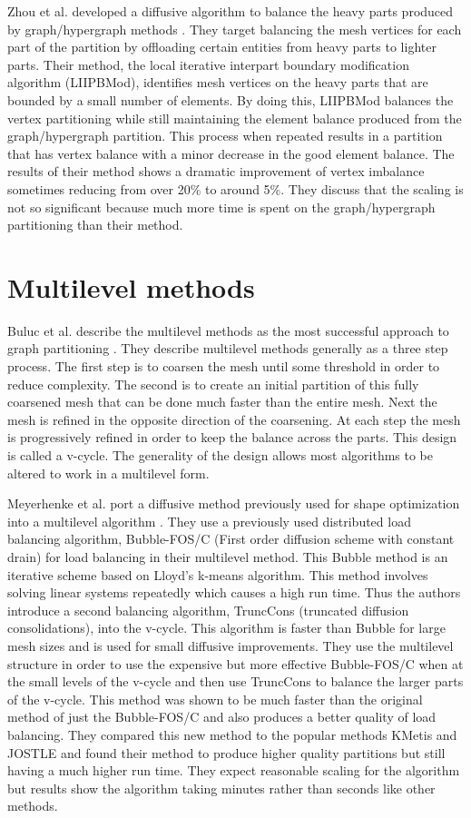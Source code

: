 \documentclass{thesis}
\begin{document}
Zhou et al. developed a diffusive algorithm to balance the heavy parts produced 
by graph/hypergraph methods \cite{zhougraph}. They target balancing the mesh vertices for each
part of the partition by offloading certain entities from heavy parts to 
lighter parts. Their method, the local iterative interpart boundary 
modification algorithm (LIIPBMod), identifies mesh vertices on the heavy parts
that are bounded by a small number of elements. By doing this, LIIPBMod 
balances the vertex partitioning while still maintaining the element balance
produced from the graph/hypergraph partition. This process when repeated 
results in a partition that has vertex balance with a minor decrease in the 
good element balance. The results of their method shows a dramatic improvement
of vertex imbalance sometimes reducing from over 20\% to around 5\%. They 
discuss that the scaling is not so significant because much more time is spent 
on the graph/hypergraph partitioning than their method.


\section{Multilevel methods}
Buluc et al. describe the multilevel methods as the most successful approach to 
graph partitioning \cite{surveygraph}. They describe multilevel methods 
generally as a three step process. The first step is to coarsen the mesh 
until some threshold in order to reduce complexity. The second is to create 
an initial partition of this fully coarsened mesh that can be done much 
faster than the entire mesh. Next the mesh is refined in the opposite direction
of the coarsening. At each step the mesh is progressively refined in order to
keep the balance across the parts. This design is called a v-cycle. The 
generality of the design allows most algorithms to be altered to work in a 
multilevel form. 

Meyerhenke et al. port a diffusive method previously used for 
shape optimization into a multilevel algorithm \cite{multidiffuse}. They use a 
previously used distributed load balancing algorithm, Bubble-FOS/C (First order
diffusion scheme with constant drain) for load balancing in their multilevel
method. This Bubble method is an iterative scheme based on Lloyd's k-means 
algorithm. This method involves solving linear systems repeatedly which causes 
a high run time. Thus the authors introduce a second balancing algorithm, 
TruncCons (truncated diffusion consolidations), into the v-cycle. This 
algorithm is faster than Bubble for large mesh sizes and is used for small
diffusive improvements. They use the multilevel structure in order to use 
the expensive but more effective Bubble-FOS/C when at the small levels of the 
v-cycle and then use TruncCons to balance the larger parts of the v-cycle. 
This method was shown to be much faster than the original method 
of just the Bubble-FOS/C and also produces a better quality of load balancing. 
They compared this new method to the popular methods KMetis and JOSTLE and 
found their method to produce higher quality partitions but still having a
much higher run time. They expect reasonable scaling for the algorithm but 
results show the algorithm taking minutes rather than seconds like other 
methods.
\end{document}
